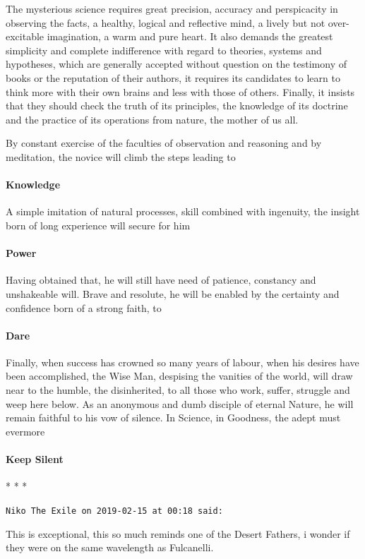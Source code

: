 The mysterious science requires great precision, accuracy and perspicacity in observing the facts, a healthy, logical and reflective mind, a lively but not over-excitable imagination, a warm and pure heart. It also demands the greatest simplicity and complete indifference with regard to theories, systems and hypotheses, which are generally accepted without question on the testimony of books or the reputation of their authors, it requires its candidates to learn to think more with their own brains and less with those of others. Finally, it insists that they should check the truth of its principles, the knowledge of its doctrine and the practice of its operations from nature, the mother of us all.

By constant exercise of the faculties of observation and reasoning and by meditation, the novice will climb the steps leading to 

\paragraph{Knowledge}
A simple imitation of natural processes, skill combined with ingenuity, the insight born of long experience will secure for him

\paragraph{Power}
Having obtained that, he will still have need of patience, constancy and unshakeable will. Brave and resolute, he will be enabled by the certainty and confidence born of a strong faith, to

\paragraph{Dare}
Finally, when success has crowned so many years of labour, when his desires have been accomplished, the Wise Man, despising the vanities of the world, will draw near to the humble, the disinherited, to all those who work, suffer, struggle and weep here below. As an anonymous and dumb disciple of eternal Nature, he will remain faithful to his vow of silence. In Science, in Goodness, the adept must evermore

\paragraph{Keep Silent}


\begin{center}* * *\end{center}

\begin{footnotesize}\begin{sffamily}



\texttt{Niko The Exile on 2019-02-15 at 00:18 said: }

This is exceptional, this so much reminds one of the Desert Fathers, i wonder if they were on the same wavelength as Fulcanelli.


\end{sffamily}\end{footnotesize}

